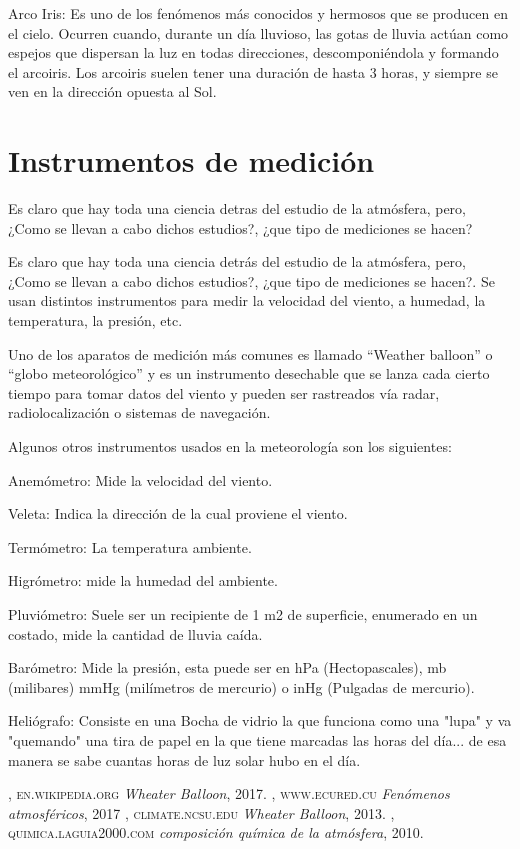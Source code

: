 \documentclass[11pt]{article}
\begin{document}
Arco Iris:
Es uno de los fenómenos más conocidos y hermosos que se producen en el cielo. Ocurren cuando, durante un día lluvioso, las gotas de lluvia actúan como espejos que dispersan la luz en todas direcciones, descomponiéndola y formando el arcoiris. Los arcoiris suelen tener una duración de hasta 3 horas, y siempre se ven en la dirección opuesta al Sol.


\section*{Instrumentos de medición}
Es claro que hay toda una ciencia detras del estudio de la atmósfera, pero, ¿Como se llevan a cabo dichos estudios?, ¿que tipo de mediciones se hacen?

Es claro que hay toda una ciencia detrás del estudio de la atmósfera, pero, ¿Como se llevan a cabo dichos estudios?, ¿que tipo de mediciones se hacen?. Se usan distintos instrumentos para medir la velocidad del viento, a humedad, la temperatura, la presión, etc.

Uno de los aparatos de medición más comunes es llamado “Weather balloon” o “globo meteorológico” y es un instrumento desechable que se lanza cada cierto tiempo para tomar datos del viento y pueden ser rastreados vía radar, radiolocalización o sistemas de navegación. 

Algunos otros instrumentos usados en la meteorología son los siguientes:

Anemómetro: Mide la velocidad del viento. 

Veleta: Indica la dirección de la cual proviene el viento.

Termómetro: La temperatura ambiente.

Higrómetro: mide la humedad del ambiente.

Pluviómetro: Suele ser un recipiente de 1 m2 de superficie, enumerado en un costado, mide la cantidad de lluvia caída.

Barómetro: Mide la presión, esta puede ser en hPa (Hectopascales), mb (milibares) mmHg (milímetros de mercurio) o inHg (Pulgadas de mercurio).

Heliógrafo: Consiste en una Bocha de vidrio la que funciona como una "lupa" y va "quemando" una tira de papel en la que tiene marcadas las horas del día... de esa manera se sabe cuantas horas de luz solar hubo en el día. 



\renewcommand{\refname}{Bibliografía}
\begin{thebibliography}{9}
, \textsc{en.wikipedia.org}
\textit{Wheater Balloon}, 2017.
, \textsc{www.ecured.cu}
\textit{Fenómenos atmosféricos}, 2017
, \textsc{climate.ncsu.edu}
\textit{Wheater Balloon}, 2013.
, \textsc{quimica.laguia2000.com}
\textit{composición química de la atmósfera}, 2010.
\end{thebibliography}
\end{document}
